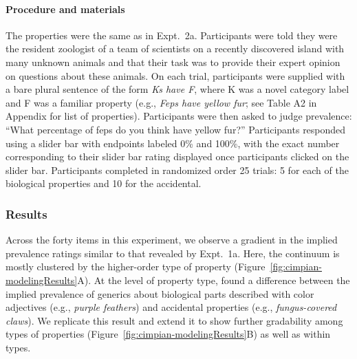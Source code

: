 \documentclass[floatsintext,man]{apa6}
\let\oldparagraph\paragraph
\renewcommand{\paragraph}[1]{\oldparagraph{#1}\mbox{}}
\newcommand{\ndg}[1]{{\textcolor{Green}{[ndg: #1]}}}
\begin{document}
\paragraph{Procedure and materials}
The properties were the same as in Expt.~2a.
Participants were told they were the resident zoologist of a team of scientists on a recently discovered island with many unknown animals and that their task was to provide their expert opinion on questions about these animals.
On each trial, participants were supplied with a bare plural sentence of the form \emph{Ks have F}, where K was a novel category label and F was a familiar property (e.g., \emph{Feps have yellow fur}; see Table A2 in Appendix for list of properties).
Participants were then asked to judge prevalence: \enquote{What percentage of feps do you think have yellow fur?}
Participants responded using a slider bar with endpoints labeled 0\% and 100\%, with the exact number corresponding to their slider bar rating displayed once participants clicked on the slider bar.
Participants completed in randomized order 25 trials: 5 for each of the biological properties and 10 for the accidental.

\hypertarget{results-and-discussion}{%
\subsubsection{Results}\label{results-and-discussion}}

Across the forty items in this experiment, we observe a gradient in the implied prevalence ratings similar to that revealed by Expt.~1a. Here, the continuum is mostly clustered by the higher-order type of property (Figure~\ref{fig:cimpian-modelingResults}A).
At the level of property type,  found a difference between the implied prevalence of generics about biological parts described with color adjectives (e.g., \emph{purple feathers}) and accidental properties (e.g., \emph{fungus-covered claws}).
We replicate this result and extend it to show further gradability among types of properties (Figure~\ref{fig:cimpian-modelingResults}B) as well as within types.
\end{document}
